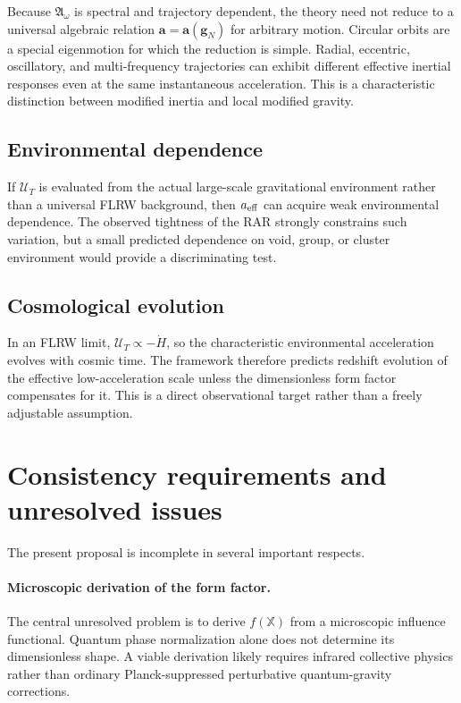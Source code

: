 \documentclass[11pt]{article}
\newcommand{\UT}{\mathcal{U}_{T}}
\newcommand{\Arel}{\mathfrak{A}}
\newcommand{\Xop}{\mathbb{X}}
\begin{document}
Because $\Arel_\omega$ is spectral and trajectory dependent, the theory need not reduce to a universal algebraic relation $\bm a=\bm a(\bm g_N)$ for arbitrary motion. Circular orbits are a special eigenmotion for which the reduction is simple. Radial, eccentric, oscillatory, and multi-frequency trajectories can exhibit different effective inertial responses even at the same instantaneous acceleration. This is a characteristic distinction between modified inertia and local modified gravity.

\subsection{Environmental dependence}

If $\UT$ is evaluated from the actual large-scale gravitational environment rather than a universal FLRW background, then $a_{\rm eff}$ can acquire weak environmental dependence. The observed tightness of the RAR strongly constrains such variation, but a small predicted dependence on void, group, or cluster environment would provide a discriminating test.

\subsection{Cosmological evolution}

In an FLRW limit, $\UT\propto-\dot H$, so the characteristic environmental acceleration evolves with cosmic time. The framework therefore predicts redshift evolution of the effective low-acceleration scale unless the dimensionless form factor compensates for it. This is a direct observational target rather than a freely adjustable assumption.

\section{Consistency requirements and unresolved issues}

The present proposal is incomplete in several important respects.

\paragraph{Microscopic derivation of the form factor.}
The central unresolved problem is to derive $f(\Xop)$ from a microscopic influence functional. Quantum phase normalization alone does not determine its dimensionless shape. A viable derivation likely requires infrared collective physics rather than ordinary Planck-suppressed perturbative quantum-gravity corrections.
\end{document}
